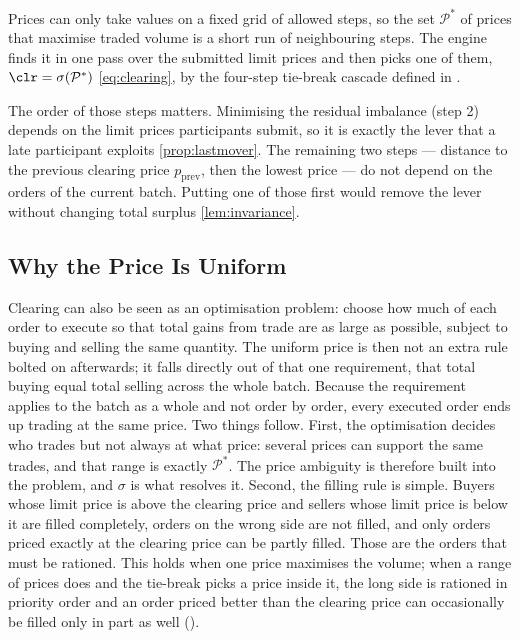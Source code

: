 Prices can only take values on a fixed grid of allowed steps, so the set
$\mathcal{P}^{*}$ of prices that maximise traded volume is a short run of
neighbouring steps. The engine finds it in one pass over the submitted
limit prices and then picks one of them, $\clr = \sigma(\mathcal{P}^{*})$
\eqref{eq:clearing}, by the four-step tie-break cascade defined in
.

The order of those steps matters. Minimising the residual imbalance
(step 2) depends on the limit prices participants submit, so it is
exactly the lever that a late participant exploits \eqref{prop:lastmover}.
The remaining two steps --- distance to the previous clearing price
$p_{\mathrm{prev}}$, then the lowest price --- do not depend on the orders
of the current batch. Putting one of those first would remove the lever
without changing total surplus \eqref{lem:invariance}.

\subsection{Why the Price Is Uniform}

Clearing can also be seen as an optimisation problem: choose how much of each
order to execute so that total gains from trade are as large as possible,
subject to buying and selling the same quantity. The uniform price is then not
an extra rule bolted on afterwards; it falls directly out of that one
requirement, that total buying equal total selling across the whole
batch. Because the requirement applies to the batch as a whole and not
order by order, every executed order ends up trading at the same price.
Two things follow. First, the optimisation decides who trades but
not always at what price: several prices can support the same trades, and
that range is exactly $\mathcal{P}^{*}$. The price ambiguity is therefore
built into the problem, and $\sigma$ is what resolves it. Second, the
filling rule is simple. Buyers whose limit price is above the clearing price
and sellers whose limit price is below it are filled completely, orders on the
wrong side are not filled, and only orders priced exactly at the clearing
price can be partly filled. Those are the orders that must be rationed. This
holds when one price maximises the volume; when a range of prices does and the
tie-break picks a price inside it, the long side is rationed in priority order
and an order priced better than the clearing price can occasionally be filled
only in part as well ().

